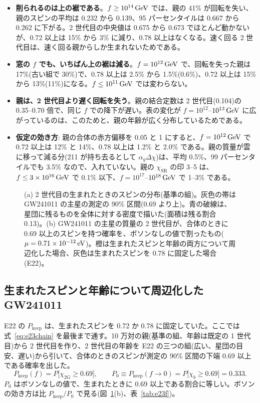 \begin{itemize}
\item \textbf{削られるのは上の裾である}。$f\ge10^{14}\,\mathrm{GeV}$ では、親の 41\% が回転を失い、親のスピンの平均は 0.232 から 0.139、95 パーセンタイルは 0.667 から 0.262 に下がる。2 世代目の中央値は 0.675 から 0.673 でほとんど動かないが、0.72 以上は 15\% から 3\% に減り、0.78 以上はなくなる。速く回る 2 世代目は、速く回る親からしか生まれないためである。
\item \textbf{窓の $f$ でも、いちばん上の裾は減る}。$f=10^{12}\,\mathrm{GeV}$ で、回転を失った親は 17\%(古い組で 30\%)で、0.78 以上は 2.5\% から 1.5\%(0.6\%)、0.72 以上は 15\% から 13\%(11\%)になる。$f\le10^{11}\,\mathrm{GeV}$ では変わらない。
\item \textbf{親は、2 世代目より遅く回転を失う}。親の結合定数は 2 世代目(0.104)の 0.35--0.70 倍で、同じ $f$ での降下が遅い。表の変化が $f=10^{12}$--$10^{13}\,\mathrm{GeV}$ に広がっているのは、このためと、親の年齢が広く分布しているためである。
\item \textbf{仮定の効き方}: 親の合体の赤方偏移を 0.05 と 1 にすると、$f=10^{12}\,\mathrm{GeV}$ で 0.72 以上は 12\% と 14\%、0.78 以上は 1.2\% と 2.0\% である。親の質量が雲に移って減る分(211 が持ち去るとして $\alpha_g\Delta\chi$)は、平均 0.5\%、99 パーセンタイルでも 3.5\% なので、入れていない。親の $\chi_\mathrm{SR}$ の印 3--5 は、$f\le3\times10^{16}\,\mathrm{GeV}$ で 0.1\% 以下、$f=10^{17}$--$10^{18}\,\mathrm{GeV}$ で 1--3\% である。
\end{itemize}

\begin{figure}[H]
\centering

\caption{(a) 2 世代目の生まれたときのスピンの分布(基準の組)。灰色の帯は GW241011 の主星の測定の 90\% 区間(0.69 より上)。青の破線は、星団に残るものを全体に対する密度で描いた(面積は残る割合 0.13)。(b) GW241011 の主星の質量の 2 世代目が、合体のときに 0.69 以上のスピンを持つ確率を、ボソンなしの値で割ったもの($\mu=0.71\times10^{-12}\,\mathrm{eV}$)。橙は生まれたスピンと年齢の両方について周辺化した場合、灰色は生まれたスピンを 0.78 に固定した場合(E22)。}
\label{fig:e23}
\end{figure}

\subsection{生まれたスピンと年齢について周辺化した GW241011}

E22 の $P_\mathrm{keep}$ は、生まれたスピンを 0.72 か 0.78 に固定していた。ここでは式~\eqref{eq:e23chain} を最後まで通す。10 万対の親(基準の組、年齢は既定の 1 世代目)から 2 世代目を作り、2 世代目の年齢を E22 の三つの組(広い、星団の目安、遅い)から引いて、合体のときのスピンが測定の 90\% 区間の下端 0.69 以上である確率を出した。
\begin{equation}
P_\mathrm{keep}(f)=P\bigl[\chi_\mathrm{2G}\ge0.69\bigr],\qquad P_0\equiv P_\mathrm{keep}(f\to0)=P\bigl[\chi_b\ge0.69\bigr]=0.333.
\end{equation}
$P_0$ はボソンなしの値で、生まれたときに 0.69 以上である割合に等しい。ボソンの効き方は比 $P_\mathrm{keep}/P_0$ で見る(図~\ref{fig:e23}(b)、表~\ref{tab:e23f})。

